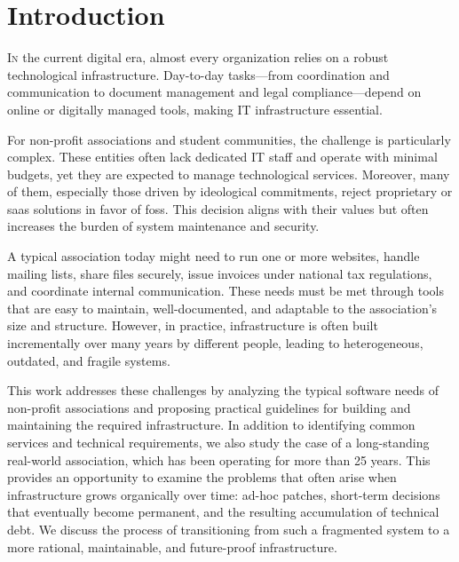 %

\chapter{Introduction}
\label{chap:introduction}

\lettrine{I}{n} the current digital era, almost every organization relies on a robust technological infrastructure. Day-to-day tasks---from coordination and communication to document management and legal compliance---depend on online or digitally managed tools, making IT infrastructure essential.

For non-profit associations and student communities, the challenge is particularly complex. These entities often lack dedicated IT staff and operate with minimal budgets, yet they are expected to manage technological services. Moreover, many of them, especially those driven by ideological commitments, reject proprietary or \gls{saas} solutions in favor of \gls{foss}. This decision aligns with their values but often increases the burden of system maintenance and security.

A typical association today might need to run one or more websites, handle mailing lists, share files securely, issue invoices under national tax regulations, and coordinate internal communication. These needs must be met through tools that are easy to maintain, well-documented, and adaptable to the association's size and structure. However, in practice, infrastructure is often built incrementally over many years by different people, leading to heterogeneous, outdated, and fragile systems.

This work addresses these challenges by analyzing the typical software needs of non-profit associations and proposing practical guidelines for building and maintaining the required infrastructure. In addition to identifying common services and technical requirements, we also study the case of a long-standing real-world association, which has been operating for more than 25 years. This provides an opportunity to examine the problems that often arise when infrastructure grows organically over time: ad-hoc patches, short-term decisions that eventually become permanent, and the resulting accumulation of technical debt. We discuss the process of transitioning from such a fragmented system to a more rational, maintainable, and future-proof infrastructure.


